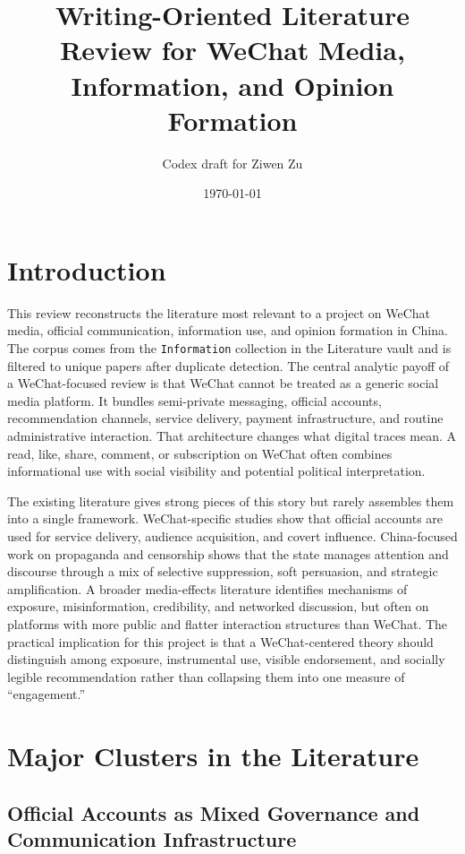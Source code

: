 \documentclass[12pt]{article}
\title{Writing-Oriented Literature Review for WeChat Media, Information, and Opinion Formation}
\author{Codex draft for Ziwen Zu}
\date{\today}
\begin{document}
        \maketitle

        \section{Introduction}

        This review reconstructs the literature most relevant to a project on WeChat media, official communication, information use, and opinion formation in China. The corpus comes from the \texttt{Information} collection in the Literature vault and is filtered to unique papers after duplicate detection. The central analytic payoff of a WeChat-focused review is that WeChat cannot be treated as a generic social media platform. It bundles semi-private messaging, official accounts, recommendation channels, service delivery, payment infrastructure, and routine administrative interaction. That architecture changes what digital traces mean. A read, like, share, comment, or subscription on WeChat often combines informational use with social visibility and potential political interpretation.

        The existing literature gives strong pieces of this story but rarely assembles them into a single framework. WeChat-specific studies show that official accounts are used for service delivery, audience acquisition, and covert influence. China-focused work on propaganda and censorship shows that the state manages attention and discourse through a mix of selective suppression, soft persuasion, and strategic amplification. A broader media-effects literature identifies mechanisms of exposure, misinformation, credibility, and networked discussion, but often on platforms with more public and flatter interaction structures than WeChat. The practical implication for this project is that a WeChat-centered theory should distinguish among exposure, instrumental use, visible endorsement, and socially legible recommendation rather than collapsing them into one measure of ``engagement.''

        \section{Major Clusters in the Literature}

        \subsection{Official Accounts as Mixed Governance and Communication Infrastructure}
\end{document}
